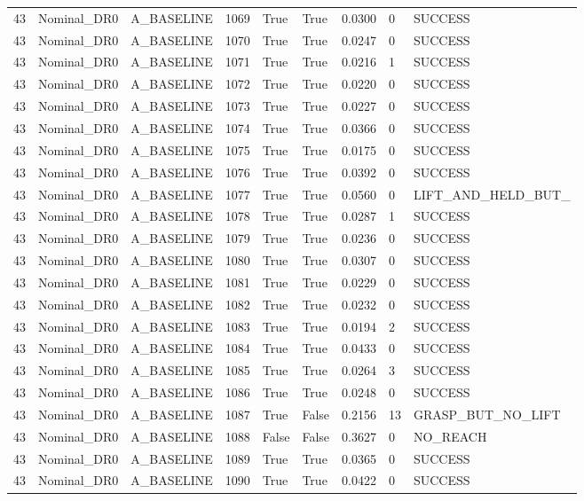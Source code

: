 \documentclass[11pt,a4paper,oneside]{book}
\begin{document}
\begin{longtable}{l l l l l l l l l}
43 & Nominal\_DR0 & A\_BASELINE & 1069 & True & True & 0.0300 & 0 & SUCCESS \\
43 & Nominal\_DR0 & A\_BASELINE & 1070 & True & True & 0.0247 & 0 & SUCCESS \\
43 & Nominal\_DR0 & A\_BASELINE & 1071 & True & True & 0.0216 & 1 & SUCCESS \\
43 & Nominal\_DR0 & A\_BASELINE & 1072 & True & True & 0.0220 & 0 & SUCCESS \\
43 & Nominal\_DR0 & A\_BASELINE & 1073 & True & True & 0.0227 & 0 & SUCCESS \\
43 & Nominal\_DR0 & A\_BASELINE & 1074 & True & True & 0.0366 & 0 & SUCCESS \\
43 & Nominal\_DR0 & A\_BASELINE & 1075 & True & True & 0.0175 & 0 & SUCCESS \\
43 & Nominal\_DR0 & A\_BASELINE & 1076 & True & True & 0.0392 & 0 & SUCCESS \\
43 & Nominal\_DR0 & A\_BASELINE & 1077 & True & True & 0.0560 & 0 & LIFT\_AND\_HELD\_BUT\_ \\
43 & Nominal\_DR0 & A\_BASELINE & 1078 & True & True & 0.0287 & 1 & SUCCESS \\
43 & Nominal\_DR0 & A\_BASELINE & 1079 & True & True & 0.0236 & 0 & SUCCESS \\
43 & Nominal\_DR0 & A\_BASELINE & 1080 & True & True & 0.0307 & 0 & SUCCESS \\
43 & Nominal\_DR0 & A\_BASELINE & 1081 & True & True & 0.0229 & 0 & SUCCESS \\
43 & Nominal\_DR0 & A\_BASELINE & 1082 & True & True & 0.0232 & 0 & SUCCESS \\
43 & Nominal\_DR0 & A\_BASELINE & 1083 & True & True & 0.0194 & 2 & SUCCESS \\
43 & Nominal\_DR0 & A\_BASELINE & 1084 & True & True & 0.0433 & 0 & SUCCESS \\
43 & Nominal\_DR0 & A\_BASELINE & 1085 & True & True & 0.0264 & 3 & SUCCESS \\
43 & Nominal\_DR0 & A\_BASELINE & 1086 & True & True & 0.0248 & 0 & SUCCESS \\
43 & Nominal\_DR0 & A\_BASELINE & 1087 & True & False & 0.2156 & 13 & GRASP\_BUT\_NO\_LIFT \\
43 & Nominal\_DR0 & A\_BASELINE & 1088 & False & False & 0.3627 & 0 & NO\_REACH \\
43 & Nominal\_DR0 & A\_BASELINE & 1089 & True & True & 0.0365 & 0 & SUCCESS \\
43 & Nominal\_DR0 & A\_BASELINE & 1090 & True & True & 0.0422 & 0 & SUCCESS \\

\end{longtable}
\end{document}
